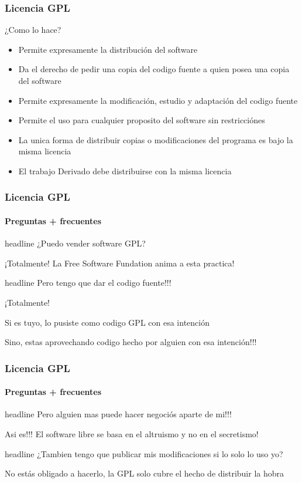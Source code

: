 \documentclass[11pt]{beamer}
\newcommand{\question}[1]
{
\begin{beamercolorbox}[sep=1mm, rounded=true, shadow=true]{headline}
#1
\end{beamercolorbox}
}
\begin{document}
\begin{frame}
\frametitle{Licencia GPL}
\begin{block}{¿Como lo hace?}
\begin{itemize}[<+-| alert@+>]
\item Permite \alert{expresamente} la distribuci\'on del software
\item Da el derecho de pedir una copia del codigo fuente \alert{a quien posea una copia} del software
\item Permite \alert{expresamente} la modificaci\'on, estudio y adaptaci\'on del codigo fuente
\item Permite el uso \alert{para cualquier proposito} del software \alert{sin restricci\'ones}
\item \alert{La unica} forma de distribuir copias o modificaciones del programa es \alert{bajo la misma licencia}
\item El trabajo \alert{Derivado} debe distribuirse con la misma licencia
\end{itemize}
\end{block}
\end{frame}

\begin{frame}
\frametitle{Licencia GPL}
\framesubtitle{Preguntas + frecuentes}

\question{¿Puedo vender software GPL?}
\pause
¡Totalmente! La Free Software Fundation anima a esta practica!
\pause
\question{Pero tengo que dar el codigo fuente!!!}
¡Totalmente!

Si es tuyo, lo pusiste como codigo GPL con esa intención

Sino, estas aprovechando codigo hecho por alguien con esa intención!!!

\end{frame}

\begin{frame}
\frametitle{Licencia GPL}
\framesubtitle{Preguntas + frecuentes}

\question{Pero alguien mas puede hacer negociós aparte de mi!!!}
\pause
Asi es!!! El software libre se basa en el altruismo y no en el secretismo!
\pause

\question{¿Tambien tengo que publicar mis modificaciones si lo solo lo uso yo?}
\pause
No estás obligado a hacerlo, la GPL solo cubre el hecho de distribuir la hobra

\end{frame}
\end{document}
